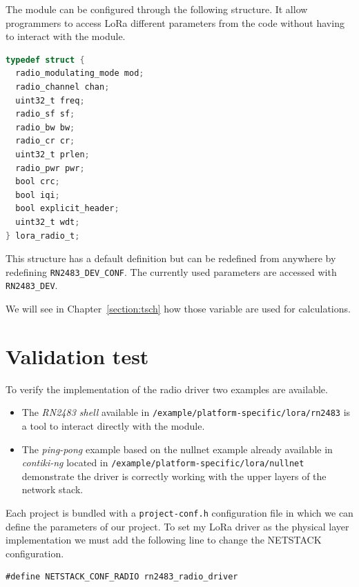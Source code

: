 The module can be configured through the following structure.
It allow programmers to access LoRa different parameters from the code without
having to interact with the module.

\begin{lstlisting}[language=C]
typedef struct {
  radio_modulating_mode mod;
  radio_channel chan;
  uint32_t freq;
  radio_sf sf;
  radio_bw bw;
  radio_cr cr;
  uint32_t prlen;
  radio_pwr pwr;
  bool crc;
  bool iqi;
  bool explicit_header;
  uint32_t wdt;
} lora_radio_t;
\end{lstlisting}

This structure has a default definition but can be redefined from anywhere 
by redefining \lstinline{RN2483_DEV_CONF}.
The currently used parameters are accessed with \lstinline{RN2483_DEV}.

We will see in Chapter~\ref{section:tsch} how those variable are used for
calculations.

\section{Validation test}

To verify the implementation of the radio driver two examples are available.

\begin{itemize}
  \item The \emph{RN2483 shell} available in
    \lstinline{/example/platform-specific/lora/rn2483} is a tool to interact
    directly with the module.
  \item The \emph{ping-pong} example based on the nullnet example already
    available in \emph{contiki-ng} located in 
    \lstinline{/example/platform-specific/lora/nullnet} demonstrate the driver
    is correctly working with the upper layers of the network stack.
\end{itemize}

Each project is bundled with a \lstinline{project-conf.h}
configuration file in which we can define the parameters of our project. 
To set my LoRa driver as the physical layer implementation we must add the
following line to change the NETSTACK configuration.

\begin{lstlisting}
#define NETSTACK_CONF_RADIO rn2483_radio_driver
\end{lstlisting}

